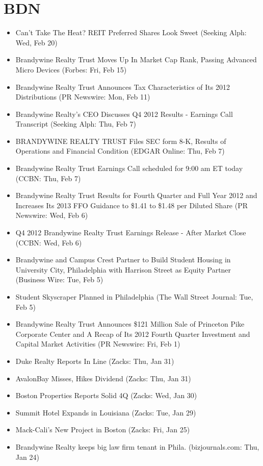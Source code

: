 \documentclass[11pt,asymmetric]{article}
\begin{document}
\section*{BDN}
\begin{itemize}
\item Can't Take The Heat? REIT Preferred Shares Look Sweet (Seeking Alph: Wed, Feb 20)
\item Brandywine Realty Trust Moves Up In Market Cap Rank, Passing Advanced Micro Devices (Forbes: Fri, Feb 15)
\item Brandywine Realty Trust Announces Tax Characteristics of Its 2012 Distributions (PR Newswire: Mon, Feb 11)
\item Brandywine Realty's CEO Discusses Q4 2012 Results - Earnings Call Transcript (Seeking Alph: Thu, Feb 7)
\item BRANDYWINE REALTY TRUST Files SEC form 8-K, Results of Operations and Financial Condition (EDGAR Online: Thu, Feb 7)
\item Brandywine Realty Trust Earnings Call scheduled for 9:00 am ET today (CCBN: Thu, Feb 7)
\item Brandywine Realty Trust Results for Fourth Quarter and Full Year 2012 and Increases Its 2013 FFO Guidance to \$1.41 to \$1.48 per Diluted Share (PR Newswire: Wed, Feb 6)
\item Q4 2012 Brandywine Realty Trust Earnings Release - After Market Close (CCBN: Wed, Feb 6)
\item Brandywine and Campus Crest Partner to Build Student Housing in University City, Philadelphia with Harrison Street as Equity Partner (Business Wire: Tue, Feb 5)
\item Student Skyscraper Planned in Philadelphia (The Wall Street Journal: Tue, Feb 5)
\item Brandywine Realty Trust Announces \$121 Million Sale of Princeton Pike Corporate Center and A Recap of Its 2012 Fourth Quarter Investment and Capital Market Activities (PR Newswire: Fri, Feb 1)
\item Duke Realty Reports In Line (Zacks: Thu, Jan 31)
\item AvalonBay Misses, Hikes Dividend (Zacks: Thu, Jan 31)
\item Boston Properties Reports Solid 4Q (Zacks: Wed, Jan 30)
\item Summit Hotel Expands in Louisiana (Zacks: Tue, Jan 29)
\item Mack-Cali's New Project in Boston (Zacks: Fri, Jan 25)
\item Brandywine Realty keeps big law firm tenant in Phila. (bizjournals.com: Thu, Jan 24)

\end{itemize}
\end{document}
